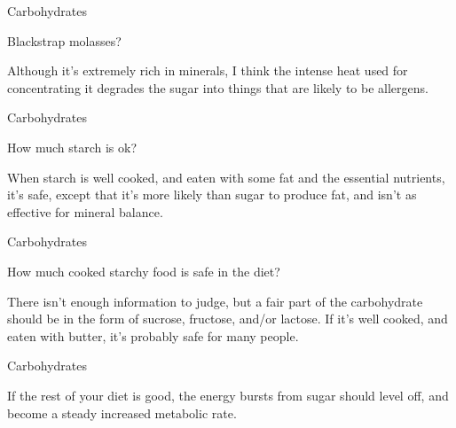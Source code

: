 \documentclass[11pt,oneside,openany,extrafontsizes]{memoir}
\begin{document}
\begin{qaexchange}{Carbohydrates}

    \begin{question}
        Blackstrap molasses?
    \end{question}

    \begin{answer}
        Although it's extremely rich in minerals, I think the intense heat used for concentrating it degrades the sugar into things that are likely to be allergens.
    \end{answer}
\end{qaexchange}

\begin{qaexchange}{Carbohydrates}

    \begin{question}
        How much starch is ok?
    \end{question}

    \begin{answer}
        When starch is well cooked, and eaten with some fat and the essential nutrients, it's safe, except that it's more likely than sugar to produce fat, and isn't as effective for mineral balance.
    \end{answer}
\end{qaexchange}

\begin{qaexchange}{Carbohydrates}

    \begin{question}
        How much cooked starchy food is safe in the diet?
    \end{question}

    \begin{answer}
        There isn't enough information to judge, but a fair part of the carbohydrate should be in the form of sucrose, fructose, and/or lactose. If it's well cooked, and eaten with butter, it's probably safe for many people.
    \end{answer}
\end{qaexchange}

\begin{standalonequote}{Carbohydrates}

    \begin{answer}
        If the rest of your diet is good, the energy bursts from sugar should level off, and become a steady increased metabolic rate.
    \end{answer}
\end{standalonequote}
\end{document}
